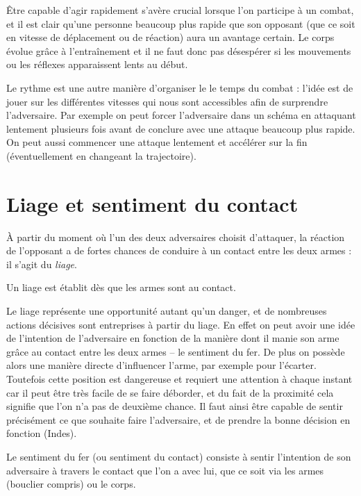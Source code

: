 Être capable d'agir rapidement s'avère crucial lorsque l'on participe à un combat, et il est clair qu'une personne beaucoup plus rapide que son opposant (que ce soit en vitesse de déplacement ou de réaction) aura un avantage certain.
Le corps évolue grâce à l'entraînement et il ne faut donc pas désespérer si les mouvements ou les réflexes apparaissent lents au début.

Le rythme est une autre manière d'organiser le le temps du combat : l'idée est de jouer sur les différentes vitesses qui nous sont accessibles afin de surprendre l'adversaire.
Par exemple on peut forcer l'adversaire dans un schéma en attaquant lentement plusieurs fois avant de conclure avec une attaque beaucoup plus rapide.
On peut aussi commencer une attaque lentement et accélérer sur la fin (éventuellement en changeant la trajectoire).


\section{Liage et sentiment du contact}


À partir du moment où l'un des deux adversaires choisit d'attaquer, la réaction de l'opposant a de fortes chances de conduire à un contact entre les deux armes : il s'agit du \emph{liage}.


\begin{definition}[Liage]
	\label{conc:def:liage}

	Un liage est établit dès que les armes sont au contact.
\end{definition}


Le liage représente une opportunité autant qu'un danger, et de nombreuses actions décisives sont entreprises à partir du liage.
En effet on peut avoir une idée de l'intention de l'adversaire en fonction de la manière dont il manie son arme grâce au contact entre les deux armes -- le sentiment du fer.
De plus on possède alors une manière directe d'influencer l'arme, par exemple pour l'écarter.
Toutefois cette position est dangereuse et requiert une attention à chaque instant car il peut être très facile de se faire déborder, et du fait de la proximité cela signifie que l'on n'a pas de deuxième chance.
Il faut ainsi être capable de sentir précisément ce que souhaite faire l'adversaire, et de prendre la bonne décision en fonction (Indes).


\begin{definition}
	\label{conc:def:sentiment-fer}

	Le sentiment du fer (ou sentiment du contact) consiste à sentir l'intention de son adversaire à travers le contact que l'on a avec lui, que ce soit via les armes (bouclier compris) ou le corps.
\end{definition}


